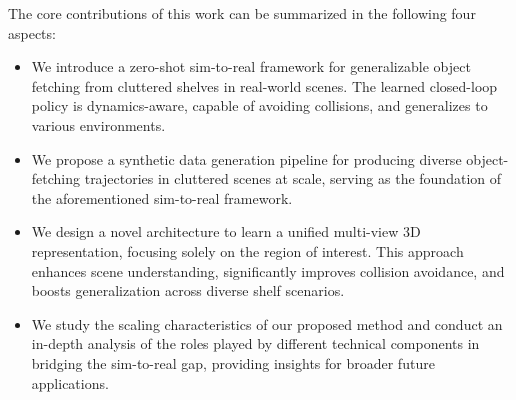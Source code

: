 The core contributions of this work can be summarized in the following four aspects:
\begin{itemize}
    \item We introduce a zero-shot sim-to-real framework for generalizable object fetching from cluttered shelves in real-world scenes. The learned closed-loop policy is dynamics-aware, capable of avoiding collisions, and generalizes to various environments.
    \item We propose a synthetic data generation pipeline for producing diverse object-fetching trajectories in cluttered scenes at scale, serving as the foundation of the aforementioned sim-to-real framework.
    \item We design a novel architecture to learn a unified multi-view 3D representation, focusing solely on the region of interest. This approach enhances scene understanding, significantly improves collision avoidance, and boosts generalization across diverse shelf scenarios.
    \item We study the scaling characteristics of our proposed method and conduct an in-depth analysis of the roles played by different technical components in bridging the sim-to-real gap, providing insights for broader future applications.
\end{itemize}